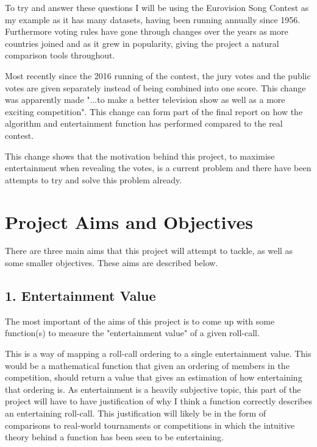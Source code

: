 \documentclass[12pt]{report}
\begin{document}
To try and answer these questions I will be using the Eurovision Song Contest as my example as it has many datasets, having been running annually since 1956. Furthermore voting rules have gone through changes over the years as more countries joined and as it grew in popularity, giving the project a natural comparison tools throughout. 

Most recently since the 2016 running of the contest, the jury votes and the public votes are given separately instead of being combined into one score. This change was apparently made "...to make a better television show as well as a more exciting competition"\cite{ref:NewVotingQuote}. This change can form part of the final report on how the algorithm and entertainment function has performed compared to the real contest.

This change shows that the motivation behind this project, to maximise entertainment when revealing the votes, is a current problem and there have been attempts to try and solve this problem already.

\section*{Project Aims and Objectives}
There are three main aims that this project will attempt to tackle, as well as some smaller objectives. These aims are described below.

\subsection*{1. Entertainment Value}
The most important of the aims of this project is to come up with some function(s) to measure the "entertainment value" of a given roll-call. 

This is a way of mapping a roll-call ordering to a single entertainment value. This would be a mathematical function that given an ordering of members in the competition, should return a value that gives an estimation of how entertaining that ordering is. As entertainment is a heavily subjective topic, this part of the project will have to have justification of why I think a function correctly describes an entertaining roll-call. This justification will likely be in the form of comparisons to real-world tournaments or competitions in which the intuitive theory behind a function has been seen to be entertaining. 
\end{document}
